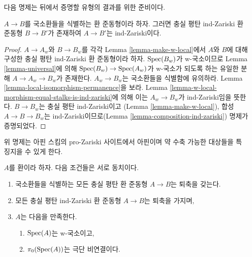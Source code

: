 \noindent
다음 명제는 뒤에서 증명할 유형의 결과를 위한 준비이다.

\begin{proposition}
\label{proposition-maps-wich-identify-local-rings}
$A \to B$를 국소환들을 식별하는 환 준동형이라 하자.
그러면 충실 평탄 ind-Zariski 환 준동형 $B \to B'$가 존재하여
$A \to B'$는 ind-Zariski이다.
\end{proposition}

\begin{proof}
$A \to A_w$와 $B \to B_w$를 각각 Lemma \ref{lemma-make-w-local}에서
$A$와 $B$에 대해 구성한 충실 평탄 ind-Zariski 환 준동형이라 하자.
$\mathop{\mathrm{Spec}}(B_w)$가 w-국소이므로 Lemma \ref{lemma-universal}에 의해
$\mathop{\mathrm{Spec}}(B_w) \to \mathop{\mathrm{Spec}}(A_w)$가 w-국소가 되도록 하는 유일한 분해
$A \to A_w \to B_w$가 존재한다. $A_w \to B_w$는 국소환들을
식별함에 유의하라. Lemma \ref{lemma-local-isomorphism-permanence}을 보라.
Lemma \ref{lemma-w-local-morphism-equal-stalks-is-ind-zariski}에 의해
이는 $A_w \to B_w$가 ind-Zariski임을 뜻한다.
$B \to B_w$는 충실 평탄 ind-Zariski이고
(Lemma \ref{lemma-make-w-local}), 합성 $A \to B \to B_w$는
ind-Zariski이므로(Lemma \ref{lemma-composition-ind-zariski})
명제가 증명되었다.
\end{proof}

\noindent
위 명제는 아핀 스킴의 pro-Zariski 사이트에서 아핀이며 약 수축 가능한
대상들을 특징지을 수 있게 한다.

\begin{lemma}
\label{lemma-w-local-extremally-disconnected}
$A$를 환이라 하자. 다음 조건들은 서로 동치이다.
\begin{enumerate}
\item 국소환들을 식별하는 모든 충실 평탄 환 준동형 $A \to B$는
퇴축을 갖는다.
\item 모든 충실 평탄 ind-Zariski 환 준동형 $A \to B$는 퇴축을 가지며,
\item $A$는 다음을 만족한다.
\begin{enumerate}
\item $\mathop{\mathrm{Spec}}(A)$는 w-국소이고,
\item $\pi_0(\mathop{\mathrm{Spec}}(A))$는 극단 비연결이다.
\end{enumerate}
\end{enumerate}
\end{lemma}

